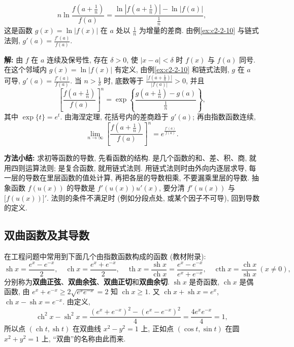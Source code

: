 \documentclass[UTF8,openany]{ctexbook}
\theoremstyle{chinesetextbook}
\newenvironment{cnsolution}{\par\indent\textbf{解:} \ignorespaces}{\par}
\begin{document}
\[
n\ln\frac{f\left(a+\frac1n\right)}{f(a)}=\frac{\ln\left|f\left(a+\frac1n\right)\right|-\ln|f(a)|}{\frac1n},
\]
这是函数 $g(x)=\ln|f(x)|$ 在 $a$ 处以 $\displaystyle\frac1n$ 为增量的差商. 由例\ref{ex:c2-2-10} 与链式法则, $\displaystyle g'(a)=\frac{f'(a)}{f(a)}$.
\begin{cnsolution}
由 $f$ 在 $a$ 连续及保号性, 存在 $\delta>0$, 使 $|x-a|<\delta$ 时 $f(x)$ 与 $f(a)$ 同号. 在这个邻域内 $g(x)=\ln|f(x)|$ 有定义, 由例\ref{ex:c2-2-10} 和链式法则, $g$ 在 $a$ 可导, $\displaystyle g'(a)=\frac{f'(a)}{f(a)}$. 当 $\displaystyle n>\frac1\delta$ 时, 底数等于 $\displaystyle\frac{\left|f\left(a+\frac1n\right)\right|}{|f(a)|}>0$, 并且
\[
\left[\frac{f\left(a+\frac1n\right)}{f(a)}\right]^n=\exp\left\{\frac{g\left(a+\frac1n\right)-g(a)}{\frac1n}\right\},
\]
其中 $\exp\{t\}=e^t$. 由海涅定理, 花括号内的差商趋于 $g'(a)$; 再由指数函数连续,
\[
\lim_{n\to\infty}\left[\frac{f\left(a+\frac1n\right)}{f(a)}\right]^n=e^{\frac{f'(a)}{f(a)}}.
\]
\end{cnsolution}
\par\indent\textbf{方法小结:} 求初等函数的导数, 先看函数的结构. 是几个函数的和、差、积、商, 就用四则运算法则; 是复合函数, 就用链式法则. 用链式法则时由外向内逐层求导, 每一层的导数在里层函数的值处计算, 再把各层的导数相乘, 不要漏乘里层的导数. 抽象函数 $f(u(x))$ 的导数是 $f'(u(x))u'(x)$, 要分清 $f'(u(x))$ 与 $\bigl[f(u(x))\bigr]'$. 法则的条件不满足时 (例如分段点处, 或某个因子不可导), 回到导数的定义.
\subsection{双曲函数及其导数}
在工程问题中常用到下面几个由指数函数构成的函数 (教材附录):
\[
\operatorname{sh}x=\frac{e^x-e^{-x}}2,\quad\operatorname{ch}x=\frac{e^x+e^{-x}}2,\quad\operatorname{th}x=\frac{\operatorname{sh}x}{\operatorname{ch}x}=\frac{e^x-e^{-x}}{e^x+e^{-x}},\quad\operatorname{cth}x=\frac{\operatorname{ch}x}{\operatorname{sh}x}\ (x\ne0),
\]
分别称为\textbf{双曲正弦}、\textbf{双曲余弦}、\textbf{双曲正切}和\textbf{双曲余切}. $\operatorname{sh}x$ 是奇函数, $\operatorname{ch}x$ 是偶函数, 由 $e^x+e^{-x}\ge2\sqrt{e^xe^{-x}}=2$ 知 $\operatorname{ch}x\ge1$. 又 $\operatorname{ch}x+\operatorname{sh}x=e^x$, $\operatorname{ch}x-\operatorname{sh}x=e^{-x}$. 由定义,
\[
\operatorname{ch}^2x-\operatorname{sh}^2x=\frac{(e^x+e^{-x})^2-(e^x-e^{-x})^2}4=\frac{4e^xe^{-x}}4=1,
\]
所以点 $(\operatorname{ch}t,\operatorname{sh}t)$ 在双曲线 $x^2-y^2=1$ 上, 正如点 $(\cos t,\sin t)$ 在圆 $x^2+y^2=1$ 上, “双曲”的名称由此而来.
\end{document}
